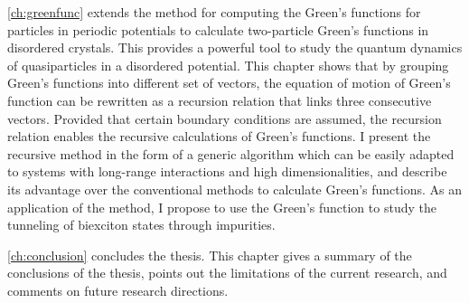 \autoref{ch:greenfunc} extends the method\cite{Berciu2010, Berciu2011, Berciu2012} for computing the Green's 
functions for particles in periodic potentials to calculate 
two-particle 
Green's functions in disordered crystals. This provides a powerful tool to study the quantum dynamics of quasiparticles in a disordered potential. 
This chapter shows that by grouping Green's functions into different set of vectors, the 
equation of motion of Green's function can be rewritten as a recursion relation that links three consecutive vectors. 
Provided that certain boundary conditions are assumed, the recursion relation enables the recursive calculations of Green's 
functions. I present the recursive method in the form of a generic algorithm which can be easily 
adapted to systems with long-range interactions and high dimensionalities, and describe its advantage over the conventional methods to calculate Green's functions. As an application of the method, I propose
to use the Green's function to study the tunneling of biexciton states through
 impurities.

\autoref{ch:conclusion} concludes the thesis. This chapter gives a summary of the conclusions of the thesis, points out the limitations of the current research, and comments on future research directions. 



